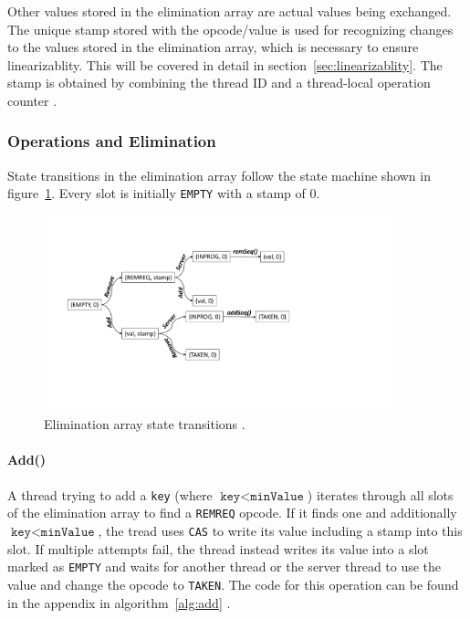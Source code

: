 Other values stored in the elimination array are actual values being exchanged. The unique stamp stored with the opcode/value is used for recognizing changes to the values stored in the elimination array, which is necessary to ensure linearizablity. This will be covered in detail in section~\ref{sec:linearizablity}. The stamp is obtained by combining the thread ID and a thread-local operation counter \cite{calciu_adaptive_2014}.

\subsubsection{Operations and Elimination}

State transitions in the elimination array follow the state machine shown in figure~\ref{fig:combining-state}. Every slot is initially \texttt{EMPTY} with a stamp of 0. 

\begin{figure}[htb]
	\centering
	\includegraphics[width=0.9\textwidth]{graphics/combining-state.pdf}
	\caption{Elimination array state transitions \cite{calciu_adaptive_2014}.}
	\label{fig:combining-state}
\end{figure}

\paragraph{Add()} A thread trying to add a \texttt{key} (where $\texttt{key} < \texttt{minValue}$) iterates through all slots of the elimination array to find a \texttt{REMREQ} opcode. If it finds one and additionally $\texttt{key} < \texttt{minValue}$, the tread uses \texttt{CAS} to write its value including a stamp into this slot. If multiple attempts fail, the thread instead writes its value into a slot marked as \texttt{EMPTY} and waits for another thread or the server thread to use the value and change the opcode to \texttt{TAKEN}. The code for this operation can be found in the appendix in algorithm~\ref{alg:add} \cite{calciu_adaptive_2014}.

